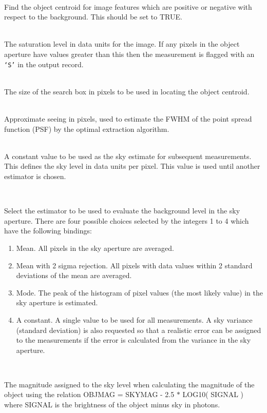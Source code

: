 \documentclass[twoside,11pt]{article}
\renewcommand{\_}{\texttt{\symbol{95}}}
\newcommand{\st}[1]{\texttt{`#1'}}
\newcommand{\sstsubsection}[1]{ \item[{#1}] \mbox{} \\}
\newcommand{\sstsubsection}[1]{\item[{#1}]}
\begin{document}
{{{\begin{enumerate}
         \end{enumerate}
      }
      \sstsubsection{
         POSITIVE = \_LOGICAL (Read)
      }{
         Find the object centroid for image features which are positive
         or negative with respect to the background. This should be set
         to TRUE.
      }
      \sstsubsection{
         SATURE = \_REAL (Read)
      }{
         The saturation level in data units for the image. If any pixels
         in the object aperture have values greater than this then the
         measurement is flagged with an \st{S} in the output record.
      }
      \sstsubsection{
         SEARCH = \_INTEGER (Read)
      }{
         The size of the search box in pixels to be used in locating the
         object centroid.
      }
      \sstsubsection{
         SEE = \_REAL (Read)
      }{
         Approximate seeing in pixels, used to estimate the FWHM of the
         point spread function (PSF) by the optimal extraction algorithm.
      }
      \sstsubsection{
         SKY = \_REAL (Read)
      }{
         A constant value to be used as the sky estimate for subsequent
         measurements. This defines the sky level in data units per
         pixel. This value is used until another estimator is chosen.
      }
      \sstsubsection{
         SKYEST = \_INTEGER (Read)
      }{
         Select the estimator to be used to evaluate the background
         level in the sky aperture. There are four possible choices
         selected by the integers 1 to 4 which have the following
         bindings:
         \begin{enumerate}
         \item  Mean. All pixels in the sky aperture are averaged.
         \item Mean with 2 sigma rejection. All pixels with data values
             within 2 standard deviations of the mean are averaged.
         \item Mode. The peak of the histogram of pixel values (the most
             likely value) in the sky aperture is estimated.
         \item A constant. A single value to be used for all
            measurements. A sky variance (standard deviation) is
            also requested so that a realistic error can be assigned
            to the measurements if the error is calculated from the
            variance in the sky aperture.
        \end{enumerate}
      }
      \sstsubsection{
         SKYMAG = \_REAL (Read)
      }{
         The magnitude assigned to the sky level when calculating the
         magnitude of the object using the relation
         OBJMAG = SKYMAG - 2.5 $*$ LOG10( SIGNAL )
         where SIGNAL is the brightness of the object minus sky in
         photons.

}}}
\end{document}
